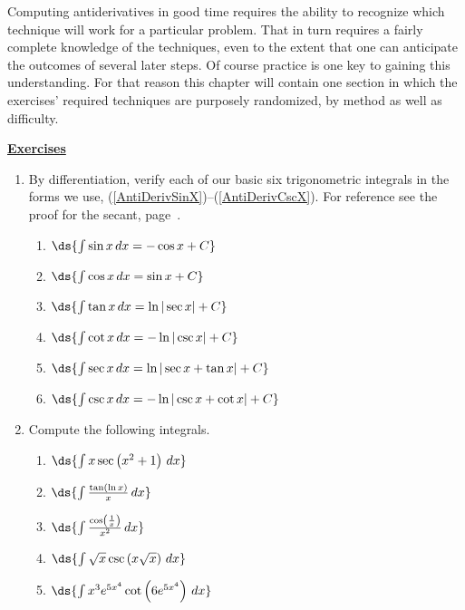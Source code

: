 Computing antiderivatives in good time requires 
the ability to recognize which technique will work for a 
particular problem.  That in turn requires 
a fairly complete knowledge of the techniques, even to the
extent that one can anticipate the outcomes of several later steps.
Of course practice is one key to gaining this understanding.
For that reason this chapter will contain one
section in which the exercises' required
techniques are purposely randomized, by method as well as difficulty.
\begin{center}
\underline{\Large{\bf Exercises}}\end{center}
\bigskip
\begin{multicols}{2}
\begin{enumerate}
\item By differentiation, verify each of our basic six trigonometric
 integrals in the forms we use,
 (\ref{AntiDerivSinX})--(\ref{AntiDerivCscX}).  For reference
 see the proof for the secant, page~\pageref{ProofOfIntegralOfSecant}.
 \begin{enumerate}
 \item $\ds{\int\sin x\,dx=-\cos x+C}$
 \item $\ds{\int\cos x\,dx=\sin x+C}$
 \item $\ds{\int\tan x\,dx=\ln|\sec x|+C}$
 \item $\ds{\int\cot x\,dx=-\ln|\csc x|+C}$
 \item $\ds{\int\sec x\,dx=\ln|\sec x+\tan x|+C}$
 \item $\ds{\int\csc x\,dx=-\ln|\csc x+\cot x|+C}$
 \end{enumerate}
\item Compute the following integrals.
 \begin{enumerate}
 \item $\ds{\int x\sec\left(x^2+1\right)\,dx}$
 \item $\ds{\int \frac{\tan(\ln x)}{x}\,dx}$
 \item $\ds{\int \frac{\cos\left(\frac1x\right)}{x^2}\,dx}$
 \item $\ds{\int \sqrt{x}\csc\left(x\sqrt{x}\right)\,dx}$
 \item $\ds{\int x^3e^{5x^4}\cot \left(6e^{5x^4}\right)\,dx}$
 \end{enumerate}




\end{enumerate}
\end{multicols}
